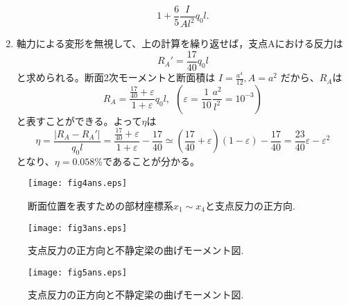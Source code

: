 \documentclass[10pt,a4j]{jarticle}
\begin{document}
\begin{enumerate}
\begin{equation}
		{1+\frac{6}{5}\frac{I}{Al^2}}q_0l.
		\label{eqn:}
	\end{equation}
\item
	軸力による変形を無視して、上の計算を繰り返せば，支点Aにおける反力は
	\begin{equation}
		R_A'=\frac{17}{40}q_0l
	\end{equation}	
	と求められる。断面2次モーメントと断面積は
	$I=\frac{a^4}{12},A=a^2$
	だから、$R_A$は
	\begin{equation}
		R_A=\frac{\frac{17}{40}+\varepsilon}{1+\varepsilon}q_0l, \ \ 
		 \left(\varepsilon=\frac{1}{10}\frac{a^2}{l^2}=10^{-3}\right)
		\label{eqn:}
	\end{equation}
	と表すことができる。よって$\eta$は
	\begin{equation}
		\eta=\frac{\left| R_A-R_A'\right|}{q_0l}=\frac{\frac{17}{40}+\varepsilon}{1+\varepsilon}-\frac{17}{40}
		\simeq 
		\left(\frac{17}{40}+\varepsilon \right) (1-\varepsilon) -\frac{17}{40}
		=\frac{23}{40}\varepsilon -\varepsilon^2
		\label{eqn:}
	\end{equation}
	となり、$\eta=0.058$\%であることが分かる。
\end{enumerate}
\begin{figure}
	\begin{center}
	\texttt{[image: fig4ans.eps]} 
	\end{center}
	\caption{断面位置を表すための部材座標系$x_1\sim x_4$と支点反力の正方向.}
	\label{fig:fig4}
\end{figure}
\begin{figure}
	\begin{center}
	\texttt{[image: fig3ans.eps]} 
	\end{center}
	\caption{支点反力の正方向と不静定梁の曲げモーメント図.}
	\label{fig:fig5}
\end{figure}

\begin{figure}
	\begin{center}
	\texttt{[image: fig5ans.eps]} 
	\end{center}
	\caption{支点反力の正方向と不静定梁の曲げモーメント図.}
	\label{fig:fig6}
\end{figure}
\end{document}
